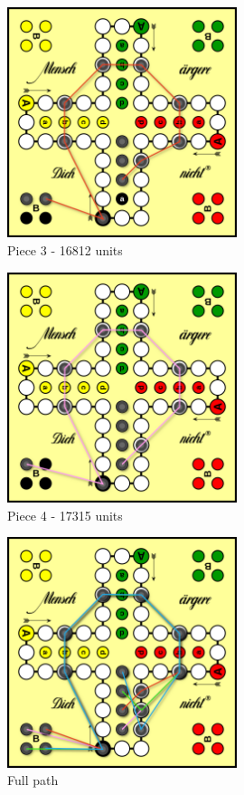 \documentclass[12pt]{article}
\begin{document}
\begin{figure}[htbp]
    \centering
    \includegraphics[width=0.6\textwidth]{images/Figure10}
    \caption{Piece 3 - 16812 units}
    \label{fig:piece3}
\end{figure}

\begin{figure}[htbp]
    \centering
    \includegraphics[width=0.6\textwidth]{images/Figure11}
    \caption{Piece 4 - 17315 units}
    \label{fig:piece4}
\end{figure}

\begin{figure}[htbp]
    \centering
    \includegraphics[width=0.6\textwidth]{images/Figure12}
    \caption{Full path}
    \label{fig:full-path}
\end{figure}
\end{document}
